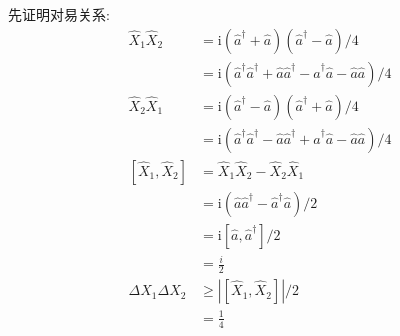 \begin{frame}
 \frametitle{}
      先证明对易关系: 
    \[ \begin{aligned}
        \hat{X}_{1} \hat{X}_{2} & =\mathrm{i}\left(\hat{a}^{\dagger}+\hat{a}\right)\left(\hat{a}^{\dagger}-\hat{a}\right) / 4\\ 
        &=\mathrm{i}\left(\hat{a}^{\dagger} \hat{a}^{\dagger}+\hat{a} \hat{a}^{\dagger}-\hat{a}^{\dagger} \hat{a}-\hat{a} \hat{a}\right) / 4 \\ 
        \hat{X}_{2} \hat{X}_{1} & = \mathrm{i}\left(\hat{a}^{\dagger}-\hat{a}\right)\left(\hat{a}^{\dagger}+\hat{a}\right) / 4 \\ 
        & =\mathrm{i}\left(\hat{a}^{\dagger} \hat{a}^{\dagger}-\hat{a} \hat{a}^{\dagger}+\hat{a}^{\dagger} \hat{a}-\hat{a} \hat{a}\right) / 4 \\ 
        \left[\hat{X}_{1}, \hat{X}_{2}\right] & =\hat{X}_{1} \hat{X}_{2}-\hat{X}_{2} \hat{X}_{1} \\ 
        &= \mathrm{i}\left(\hat{a} \hat{a}^{\dagger}-\hat{a}^{\dagger} \hat{a}\right) / 2 \\ 
        & =\mathrm{i}\left[\hat{a}, \hat{a}^{\dagger}\right] / 2  \\ &=  \frac{i}{2} \\ 
        \Delta X_1 \Delta X_2 & \geq  \left| \left[\hat{X}_{1}, \hat{X}_{2}\right]  \right| /2  \\ 
        &= \frac{1}{4}
    \end{aligned}\]

\end{frame}

